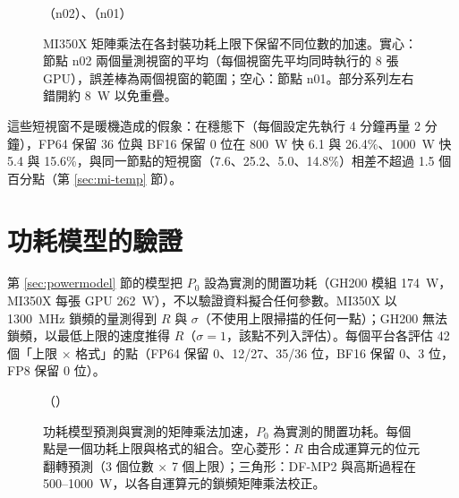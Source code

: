 \begin{figure}[tbp]
\centering
{}
\caption[MI350X 矩陣乘法在各功耗上限下的加速]{MI350X 矩陣乘法在各封裝功耗上限下保留不同位數的加速。實心：節點 n02 兩個量測視窗的平均（每個視窗先平均同時執行的 8 張 GPU），誤差棒為兩個視窗的範圍；空心：節點 n01。部分系列左右錯開約 8~W 以免重疊。}\label{fig:mi-gemm}
\begin{figsource}（n02）、（n01）\end{figsource}
\end{figure}

這些短視窗不是暖機造成的假象：在穩態下（每個設定先執行 4 分鐘再量 2 分鐘），FP64 保留 36 位與 BF16 保留 0 位在 800~W 快 6.1 與 26.4\%、1000~W 快 5.4 與 15.6\%，與同一節點的短視窗（7.6、25.2、5.0、14.8\%）相差不超過 1.5 個百分點（第 \ref{sec:mi-temp} 節）。

\section{功耗模型的驗證}\label{sec:mi-model}

第 \ref{sec:powermodel} 節的模型把 $P_0$ 設為實測的閒置功耗（GH200 模組 174~W，MI350X 每張 GPU 262~W），不以驗證資料擬合任何參數。MI350X 以 1300~MHz 鎖頻的量測得到 $R$ 與 $\sigma$（不使用上限掃描的任何一點）；GH200 無法鎖頻，以最低上限的速度推得 $R$（$\sigma=1$，該點不列入評估）。每個平台各評估 42 個「上限 × 格式」的點（FP64 保留 0、12/27、35/36 位，BF16 保留 0、3 位，FP8 保留 0 位）。

\begin{figure}[tbp]
\centering
{}
\caption[功耗模型預測與實測的矩陣乘法加速]{功耗模型預測與實測的矩陣乘法加速，$P_0$ 為實測的閒置功耗。每個點是一個功耗上限與格式的組合。空心菱形：$R$ 由合成運算元的位元翻轉預測（3 個位數 × 7 個上限）；三角形：DF-MP2 與高斯過程在 500–1000~W，以各自運算元的鎖頻矩陣乘法校正。}\label{fig:mi-model}
\begin{figsource}（）\end{figsource}
\end{figure}

